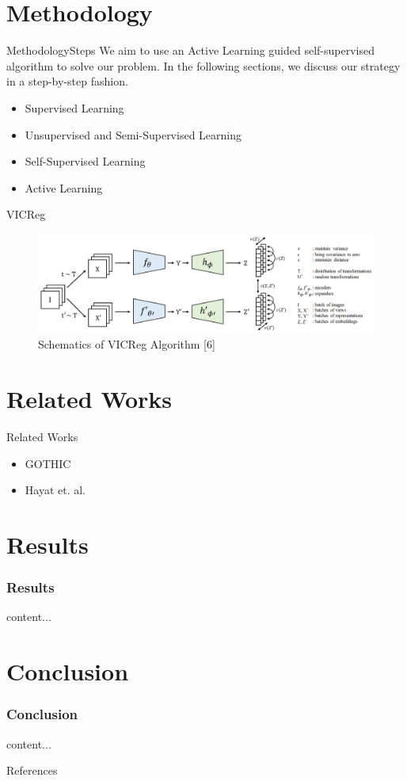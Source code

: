 \documentclass{beamer}
\begin{document}
\section{Methodology}
\begin{frame}{Methodology}{Steps}
	We aim to use an Active Learning guided self-supervised algorithm to solve our problem. In the
	following sections, we discuss our strategy in a step-by-step fashion.
	\begin{itemize}
		\item Supervised Learning
		\item Unsupervised and Semi-Supervised Learning
		\item Self-Supervised Learning
		\item Active Learning
	\end{itemize}
\end{frame}
\begin{frame}{VICReg}
	\begin{figure}
		\includegraphics[scale=0.25]{VICReg.png}
		\caption{Schematics of VICReg Algorithm [6]}
	\end{figure}

\end{frame}

\section{Related Works}
\begin{frame}{Related Works}
	\begin{itemize}
		\item GOTHIC
		\item Hayat et. al.
	\end{itemize}
\end{frame}
\section{Results}
\begin{frame}
	\frametitle{Results}
	content...
\end{frame}
\section{Conclusion}
\begin{frame}
	\frametitle{Conclusion}
	content...
\end{frame}
\begin{frame}{References}

	\printbibliography
\end{frame}
	
	
\end{document}
